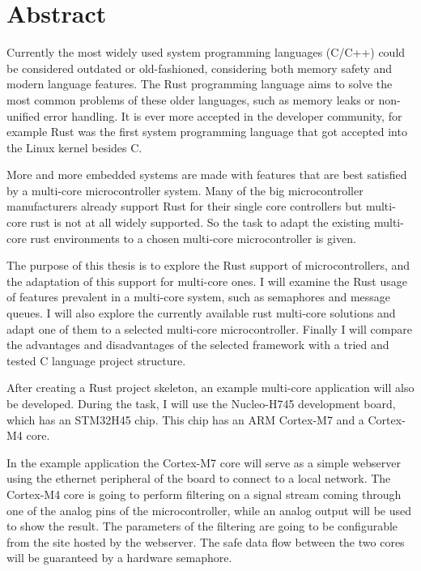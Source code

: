 \vfill
\selectenglish


\chapter*{Abstract}

Currently the most widely used system programming languages (C/C++) could be considered outdated or old-fashioned, considering both memory safety and modern language features. The Rust programming language aims to solve the most common problems of these older languages, such as memory leaks or non-unified error handling. It is ever more accepted in the developer community, for example Rust was the first system programming language that got accepted into the Linux kernel besides C. \cite{FirstRustCommit}

More and more embedded systems are made with features that are best satisfied by a multi-core microcontroller system. Many of the big microcontroller manufacturers already support Rust for their single core controllers but multi-core rust is not at all widely supported. So the task to adapt the existing multi-core rust environments to a chosen multi-core microcontroller is given.

The purpose of this thesis is to explore the Rust support of microcontrollers, and the adaptation of this support for multi-core ones. I will examine the Rust usage of features prevalent in a multi-core system, such as semaphores and message queues. I will also explore the currently available rust multi-core solutions and adapt one of them to a selected multi-core microcontroller. Finally I will compare the advantages and disadvantages of the selected framework with a tried and tested C language project structure.

After creating a Rust project skeleton, an example multi-core application will also be developed. During the task, I will use the Nucleo-H745 development board, which has an STM32H45 chip. This chip has an ARM Cortex-M7 and a Cortex-M4 core.

In the example application the Cortex-M7 core will serve as a simple webserver using the ethernet peripheral of the board to connect to a local network. The Cortex-M4 core is going to perform filtering on a signal stream coming through one of the analog pins of the microcontroller, while an analog output will be used to show the result. The parameters of the filtering are going to be configurable from the site hosted by the webserver. The safe data flow between the two cores will be guaranteed by a hardware semaphore.


\vfill
\selectthesislanguage

\setcounter{romanPage}{\value{page}}
